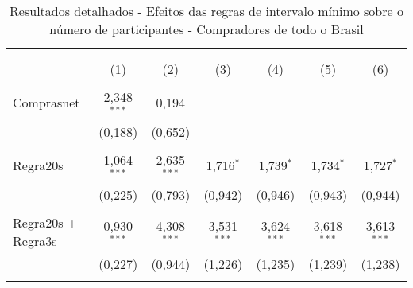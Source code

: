 \setlength{\tabcolsep}{2pt}
\begin{table}[!htbp]
\centering
\small
\begin{threeparttable}
\centering 
  \caption{Resultados detalhados - Efeitos das regras de intervalo mínimo sobre o número de participantes - Compradores de todo o Brasil} 
  \label{dd_results_participantes_br} 
\begin{tabular}{lcccccc} 
\\[-1.8ex]\hline 
\hline \\[-1.8ex] 
\\[-1.8ex] & (1) & (2) & (3) & (4) & (5) & (6)\\ 
\hline \\[-1.8ex] 

Comprasnet & 2,348$^{***}$ & 0,194 &  &  &  &  \\ 
  & (0,188) & (0,652) &  &  &  &  \\ 
  & & & & & &\\ 

 Regra20s & 1,064$^{***}$ & 2,635$^{***}$ & 1,716$^{*}$ & 1,739$^{*}$ & 1,734$^{*}$ & 1,727$^{*}$ \\ 
  & (0,225) & (0,793) & (0,942) & (0,946) & (0,943) & (0,944) \\ 
  & & & & & & \\ 
 Regra20s + Regra3s & 0,930$^{***}$ & 4,308$^{***}$ & 3,531$^{***}$ & 3,624$^{***}$ & 3,618$^{***}$ & 3,613$^{***}$ \\ 
  & (0,227) & (0,944) & (1,226) & (1,235) & (1,239) & (1,238) \\ 
  & & & & & & \\ 


\end{tabular}
\end{threeparttable}
\end{table}
